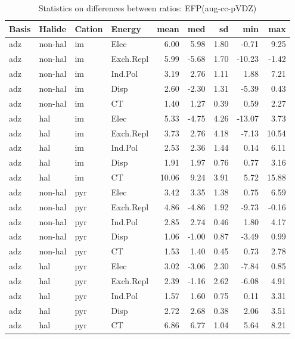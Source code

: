 \documentclass[a4paper]{article}
\begin{document}
\begin{table}[ht]
\centering
\begin{tabular}{llllrrrrr}
  \hline
Basis & Halide & Cation & Energy & mean & med & sd & min & max \\ 
  \hline
adz & non-hal & im & Elec & 6.00 & 5.98 & 1.80 & -0.71 & 9.25 \\ 
  adz & non-hal & im & Exch.Repl & 5.99 & -5.68 & 1.70 & -10.23 & -1.42 \\ 
  adz & non-hal & im & Ind.Pol & 3.19 & 2.76 & 1.11 & 1.88 & 7.21 \\ 
  adz & non-hal & im & Disp & 2.60 & -2.30 & 1.31 & -5.39 & 0.43 \\ 
  adz & non-hal & im & CT & 1.40 & 1.27 & 0.39 & 0.59 & 2.27 \\ 
  adz & hal & im & Elec & 5.33 & -4.75 & 4.26 & -13.07 & 3.73 \\ 
  adz & hal & im & Exch.Repl & 3.73 & 2.76 & 4.18 & -7.13 & 10.54 \\ 
  adz & hal & im & Ind.Pol & 2.53 & 2.36 & 1.44 & 0.14 & 6.11 \\ 
  adz & hal & im & Disp & 1.91 & 1.97 & 0.76 & 0.77 & 3.16 \\ 
  adz & hal & im & CT & 10.06 & 9.24 & 3.91 & 5.72 & 15.88 \\ 
  adz & non-hal & pyr & Elec & 3.42 & 3.35 & 1.38 & 0.75 & 6.59 \\ 
  adz & non-hal & pyr & Exch.Repl & 4.86 & -4.86 & 1.92 & -9.73 & -0.16 \\ 
  adz & non-hal & pyr & Ind.Pol & 2.85 & 2.74 & 0.46 & 1.80 & 4.17 \\ 
  adz & non-hal & pyr & Disp & 1.06 & -1.00 & 0.87 & -3.49 & 0.99 \\ 
  adz & non-hal & pyr & CT & 1.53 & 1.40 & 0.45 & 0.73 & 2.78 \\ 
  adz & hal & pyr & Elec & 3.02 & -3.06 & 2.30 & -7.84 & 0.85 \\ 
  adz & hal & pyr & Exch.Repl & 2.39 & -1.16 & 2.62 & -6.08 & 4.91 \\ 
  adz & hal & pyr & Ind.Pol & 1.57 & 1.60 & 0.75 & 0.11 & 3.31 \\ 
  adz & hal & pyr & Disp & 2.72 & 2.68 & 0.38 & 2.06 & 3.51 \\ 
  adz & hal & pyr & CT & 6.86 & 6.77 & 1.04 & 5.64 & 8.21 \\ 
   \hline
\end{tabular}
\caption{Statistics on differences between ratios: EFP(aug-cc-pVDZ)}
\end{table}
\end{document}
